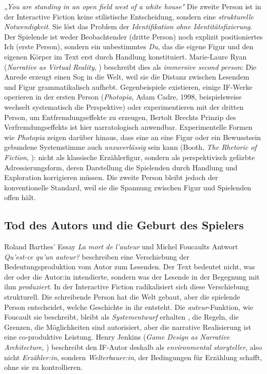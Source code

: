 \documentclass[parskip=half,a4paper,11pt]{scrreprt}
\begin{document}
\textit{„You are standing in an open field west of a white house"} Die zweite Person ist in der Interactive Fiction keine stilistische Entscheidung, sondern eine \textit{strukturelle Notwendigkeit}. Sie löst das Problem der \textit{Identifikation ohne Identitätsfixierung}. Der Spielende ist weder Beobachtender (dritte Person) noch explizit positioniertes Ich (erste Person), sondern ein unbestimmtes \textit{Du}, das die eigene Figur und den eigenen Körper im Text erst durch Handlung konstituiert. Marie-Laure Ryan (\textit{Narrative as Virtual Reality}, \citep{Ryan2001}) beschreibt dies als \textit{immersive second person}: Die Anrede erzeugt einen Sog in die Welt, weil sie die Distanz zwischen Lesendem und Figur grammatikalisch aufhebt. Gegenbeispiele existieren, einige IF-Werke operieren in der ersten Person (\textit{Photopia}, Adam Cadre, 1998, beispielsweise wechselt systematisch die Perspektive) oder experimentieren mit der dritten Person, um Entfremdungseffekte zu erzeugen, Bertolt Brechts Prinzip des Verfremdungseffekts ist hier narratologisch anwendbar. Experimentelle Formen wie \textit{Photopia} zeigen darüber hinaus, dass eine an eine Figur oder ein Bewusstsein gebundene Systemstimme auch \textit{unzuverlässig} sein kann (Booth, \textit{The Rhetoric of Fiction}, \citep{Booth1961}): nicht als klassische Erzählerfigur, sondern als perspektivisch gefärbte Adressierungsform, deren Darstellung die Spielenden durch Handlung und Exploration korrigieren müssen. Die zweite Person bleibt jedoch der konventionelle Standard, weil sie die Spannung zwischen Figur und Spielenden offen hält.

\subsection{Tod des Autors und die Geburt des Spielers}

Roland Barthes' Essay \textit{La mort de l'auteur} \citep{Barthes1968} und Michel Foucaults Antwort \textit{Qu'est-ce qu'un auteur?} \citep{Foucault1969} beschreiben eine Verschiebung der Bedeutungsproduktion vom Autor zum Lesenden. Der Text bedeutet nicht, was der oder die Autor:in intendierte, sondern was der Lesende in der Begegnung mit ihm \textit{produziert}. In der Interactive Fiction radikalisiert sich diese Verschiebung strukturell. Die schreibende Person hat die Welt gebaut, aber die spielende Person entscheidet, welche Geschichte in ihr entsteht. Die \textit{auteur}-Funktion, wie Foucault sie beschreibt, bleibt als \textit{Systementwurf }erhalten , die Regeln, die Grenzen, die Möglichkeiten sind autorisiert, aber die narrative Realisierung ist eine co-produktive Leistung. Henry Jenkins (\textit{Game Design as Narrative Architecture}, \citep{Jenkins2004}) beschreibt den IF-Autor deshalb als \textit{environmental storyteller}, also nicht \textit{Erzähler:in}, sondern \textit{Welterbauer:in}, der Bedingungen für Erzählung schafft, ohne sie zu kontrollieren.
\end{document}
